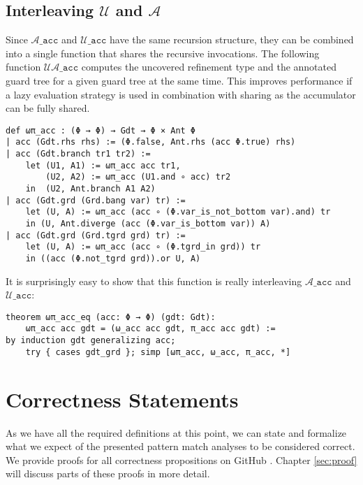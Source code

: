 \section{Interleaving $\mathcal{U}$ and $\mathcal{A}$}
\label{sec:formalizationInterleaving}

Since $\mathcal{A}\mathtt{\_acc}$ and $\mathcal{U}\mathtt{\_acc}$ have
the same recursion structure, they can be combined into a single function that shares the recursive invocations.
The following function $\mathcal{UA}\mathtt{\_acc}$ computes the uncovered refinement type and the annotated guard tree for a given guard tree at the same time.
This improves performance if a lazy evaluation strategy is used in combination with sharing as the accumulator can be fully shared.

\begin{verbatim}
def ωπ_acc : (Φ → Φ) → Gdt → Φ × Ant Φ
| acc (Gdt.rhs rhs) := (Φ.false, Ant.rhs (acc Φ.true) rhs)
| acc (Gdt.branch tr1 tr2) :=
    let (U1, A1) := ωπ_acc acc tr1,
        (U2, A2) := ωπ_acc (U1.and ∘ acc) tr2
    in  (U2, Ant.branch A1 A2)
| acc (Gdt.grd (Grd.bang var) tr) :=
    let (U, A) := ωπ_acc (acc ∘ (Φ.var_is_not_bottom var).and) tr
    in (U, Ant.diverge (acc (Φ.var_is_bottom var)) A)
| acc (Gdt.grd (Grd.tgrd grd) tr) := 
    let (U, A) := ωπ_acc (acc ∘ (Φ.tgrd_in grd)) tr
    in ((acc (Φ.not_tgrd grd)).or U, A)
\end{verbatim}

It is surprisingly easy to show that this function is really interleaving $\mathcal{A}\mathtt{\_acc}$ and $\mathcal{U}\mathtt{\_acc}$:

\begin{verbatim}
theorem ωπ_acc_eq (acc: Φ → Φ) (gdt: Gdt):
    ωπ_acc acc gdt = (ω_acc acc gdt, π_acc acc gdt) :=
by induction gdt generalizing acc;
    try { cases gdt_grd }; simp [ωπ_acc, ω_acc, π_acc, *]
\end{verbatim}


\chapter{Correctness Statements}
\label{sec:formalizationCorrectnessStmts}

As we have all the required definitions at this point, we can state and formalize what we expect of the presented pattern match analyses to be considered correct.
We provide proofs for all correctness propositions on GitHub \cite{leanProof}. Chapter \ref{sec:proof} will discuss parts of these proofs in more detail.


